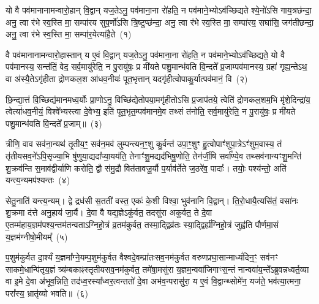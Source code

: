 \setcounter{anuvakam}{0}
यो वै पव॑मानानामन्वारो॒हान् वि॒द्वान् यज॒ते\-ऽनु॒ पव॑माना॒ना रो॑हति॒ न पव॑माने॒भ्यो\-ऽव॑च्छिद्यते श्ये॒नो॑\-ऽसि गाय॒त्रछ॑न्दा॒ अनु॒ त्वा र॑भे स्व॒स्ति मा॒ सम्पा॑रय सुप॒र्णो॑\-ऽसि त्रि॒ष्टुप्छ॑न्दा॒ अनु॒ त्वा र॑भे स्व॒स्ति मा॒ सम्पा॑रय॒ सघा॑सि॒ जग॑तीछन्दा॒ अनु॒ त्वा र॑भे स्व॒स्ति मा॒ सम्पा॑र॒येत्या॑है॒ते~(१)

वै पव॑मानानामन्वारो॒हास्तान् य ए॒वं वि॒द्वान् यज॒ते\-ऽनु॒ पव॑माना॒ना रो॑हति॒ न पव॑माने॒भ्यो\-ऽव॑च्छिद्यते॒ यो वै पव॑मानस्य॒ सन्त॑तिं॒ वेद॒ सर्व॒मायु॑रेति॒ न पु॒रायु॑षः॒ प्र मी॑यते पशु॒मान्भ॑वति वि॒न्दते᳚ प्र॒जाम्पव॑मानस्य॒ ग्रहा॑ गृह्य॒न्ते\-ऽथ॒ वा अ॑स्यै॒ते\-ऽगृ॑हीता द्रोणकल॒श आ॑धव॒नीयः॑ पूत॒भृत्तान् यदगृ॑हीत्वोपाकु॒र्यात्पव॑मानं॒ वि~(२)

छि॒न्द्या॒त्तं वि॒च्छिद्य॑मानमध्व॒र्योः प्रा॒णो\-ऽनु॒ विच्छि॑द्येतोपया॒मगृ॑हीतो\-ऽसि प्र॒जाप॑तये॒ त्वेति॑ द्रोणकल॒शम॒भि मृ॑शे॒दिन्द्रा॑य॒ त्वेत्या॑धव॒नीयं॒ विश्वे᳚भ्यस्त्वा दे॒वेभ्य॒ इति॑ पूत॒भृत॒म्पव॑मानमे॒व तथ्सं त॑नोति॒ सर्व॒मायु॑रेति॒ न पु॒रायु॑षः॒ प्र मी॑यते पशु॒मान्भ॑वति वि॒न्दते᳚ प्र॒जाम्॥~(३)

{\anuvakamend[{ए॒ते वि द्विच॑त्वारिꣳशच्च}]}%

त्रीणि॒ वाव सव॑ना॒न्यथ॑ तृ॒तीय॒ꣳ॒ सव॑न॒मव॑ लुम्पन्त्यन॒ꣳ॒शु कु॒र्वन्त॑ उपा॒ꣳ॒शुꣳ हु॒त्वोपाꣳ॑शुपा॒त्रे\-ऽꣳ॑शुम॒वास्य॒ तं तृ॑तीयसव॒ने॑\-ऽपि॒सृज्या॒भि षु॑णुया॒द्यदा᳚प्या॒यय॑ति॒ तेनाꣳ॑शु॒मद्यद॑भिषु॒णोति॒ तेन॑र्जी॒षि सर्वा᳚ण्ये॒व तथ्सव॑नान्यꣳशु॒मन्ति॑ शु॒क्रव॑न्ति स॒माव॑द्वीर्याणि करोति॒ द्वौ स॑मु॒द्रौ वित॑तावजू॒र्यौ प॒र्याव॑र्तेते ज॒ठरे॑व॒ पादाः᳚। तयोः॒ पश्य॑न्तो॒ अति॑ यन्त्य॒न्यमप॑श्यन्तः~(४)

सेतु॒नाति॑ यन्त्य॒न्यम्। द्वे द्रध॑सी स॒तती॑ वस्त॒ एकः॑ के॒शी विश्वा॒ भुव॑नानि वि॒द्वान्। ति॒रो॒धायै॒त्यसि॑तं॒ वसा॑नः शु॒क्रमा द॑त्ते अनु॒हाय॑ जा॒र्यै। दे॒वा वै यद्य॒ज्ञे\-ऽकु॑र्वत॒ तदसु॑रा अकुर्वत॒ ते दे॒वा ए॒तम्म॑हाय॒ज्ञम॑पश्य॒न्तम॑तन्वता\-ऽ\-ग्निहो॒त्रं व्र॒तम॑कुर्वत॒ तस्मा॒द्द्विव्र॑तः स्या॒द्द्विर्\mbox{}ह्य॑ग्निहो॒त्रं जुह्व॑ति पौर्णमा॒सं य॒ज्ञम॑ग्नीषो॒मीयम्᳚~(५)

प॒शुम॑कुर्वत दा॒र्श्यं य॒ज्ञमा᳚ग्ने॒यम्प॒शुम॑कुर्वत वैश्वदे॒वम्प्रा॑तःसव॒नम॑कुर्वत वरुणप्रघा॒सान्माध्यं॑दिन॒ꣳ॒ सव॑नꣳ साकमे॒धान्पि॑तृय॒ज्ञं त्र्य॑म्बकाꣴस्तृतीयसव॒नम॑कुर्वत॒ तमे॑षा॒मसु॑रा य॒ज्ञम॒न्ववा॑जिगाꣳस॒न्तं नान्ववा॑य॒न्ते᳚\-ऽब्रुवन्नध्वर्त॒व्या वा इ॒मे दे॒वा अ॑भूव॒न्निति॒ तद॑ध्व॒रस्या᳚ध्वर॒त्वन्ततो॑ दे॒वा अभ॑व॒न्परासु॑रा॒ य ए॒वं वि॒द्वान्थ्सोमे॑न॒ यज॑ते॒ भव॑त्या॒त्मना॒ परा᳚स्य॒ भ्रातृ॑व्यो भवति॥~(६)

